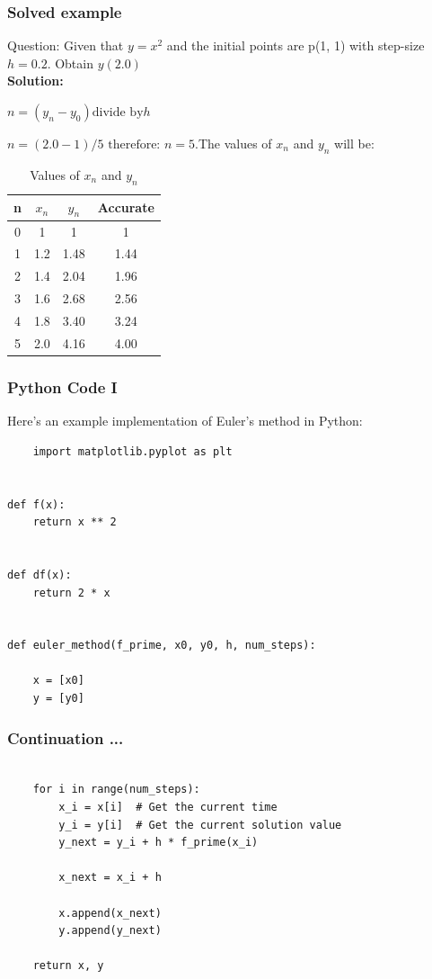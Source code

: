 \documentclass{beamer}
\begin{document}
\begin{frame}
  \frametitle{Solved example}
Question: Given that $y = x^2$ and the initial points are p(1, 1) with step-size $h = 0.2$. Obtain $y(2.0)$\\[11pt]
\textbf{Solution:}

$n = (y_n - y_0) \text{divide by} h$

$n = (2.0-1)/5$
$\text{therefore: } n = 5$.The values of $x_n$ and $y_n$ will be:

\begin{table}[H]
    \centering
    \begin{tabular}{|c|c|c|c|}
        \hline
         n&$x_n$&$y_n$&Accurate  \\ \hline
         0&1&1&1  \\ \hline 
         1&1.2&1.48&1.44  \\ \hline 
         2&1.4&2.04&1.96  \\ \hline 
         3&1.6&2.68&2.56  \\ \hline 
         4&1.8&3.40&3.24  \\ \hline 
         5&2.0&4.16&4.00  \\ \hline 
    \end{tabular}
    \caption{Values of $x_n$ and $y_n$ }
    \label{tab:my_label}
\end{table}

\end{frame}

\begin{frame}[fragile]
  \frametitle{Python Code I}

  Here's an example implementation of Euler's method in Python:

  \begin{verbatim}
    import matplotlib.pyplot as plt


def f(x):
    return x ** 2


def df(x):
    return 2 * x


def euler_method(f_prime, x0, y0, h, num_steps):

    x = [x0]  
    y = [y0] 
  \end{verbatim}
\end{frame}

\begin{frame}[fragile]
  \frametitle{Continuation ...}
   \begin{verbatim}

    for i in range(num_steps):
        x_i = x[i]  # Get the current time
        y_i = y[i]  # Get the current solution value
        y_next = y_i + h * f_prime(x_i)

        x_next = x_i + h

        x.append(x_next)
        y.append(y_next)

    return x, y
    \end{verbatim}
\end{frame}
\end{document}
